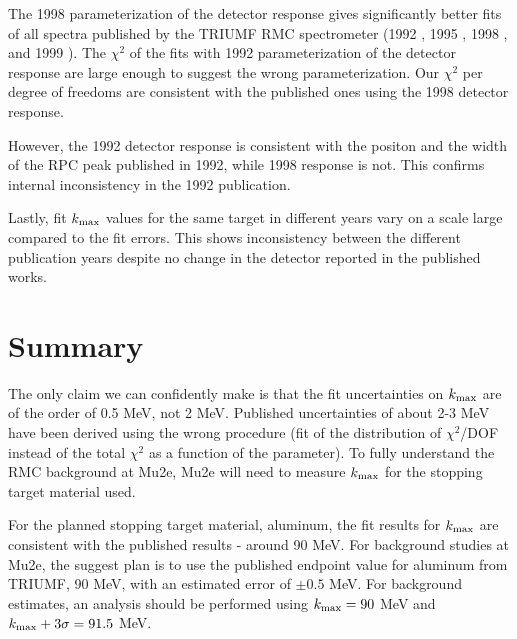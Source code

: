 \documentclass[12pt]{article}
\newcommand {\kmax}         {\mbox{$k_{\rm max}$}}
\begin{document}
The 1998 parameterization of the detector response gives significantly better
fits of all spectra published by the TRIUMF RMC spectrometer (1992 \cite{RMC_1992_PhysRevC.46.1094},
1995 \cite{RMC_1995_Bergbusch_MS_thesis}, 1998 \cite{RMC_1998_PhysRevC.58.1767}, and 
1999 \cite{RMC_1999_PhysRevC.59.2853}).
The $\chi^2$ of the fits with 1992 parameterization of the detector response are large enough
to suggest the wrong parameterization. Our $\chi^2$ per degree of freedoms are consistent with
the published ones using the 1998 detector response.

However, the 1992 detector response is consistent with the positon and the width of the 
RPC peak published in 1992, while 1998 response is not. 
This confirms internal inconsistency in the 1992 publication.

Lastly, fit $\kmax$ values for the same target in different years vary on a scale large compared
to the fit errors. This shows inconsistency between the different publication years despite
no change in the detector reported in the published works.

\section{ Summary }

The only claim we can confidently make is that the fit uncertainties on $\kmax$ are
of the order of 0.5 MeV, not 2 MeV. Published uncertainties of about 2-3 MeV
have been derived using the wrong procedure (fit of the distribution of $\chi^2$/DOF
instead of the total $\chi^2$ as a function of the parameter). To fully understand the RMC background at Mu2e,
Mu2e will need to measure $\kmax$ for the stopping target material used.


For the planned stopping target material, aluminum, the fit results for $\kmax$ are consistent with 
the published results - around 90 MeV. For background studies at Mu2e, the suggest plan is to use
the published endpoint value for aluminum from TRIUMF, 90 MeV, with an estimated error of 
$\pm 0.5$ MeV. For background estimates, an analysis should be performed using
$\kmax = 90$ MeV and $\kmax + 3\sigma = 91.5$ MeV.





% 
% 



\appendix



\end{document}
